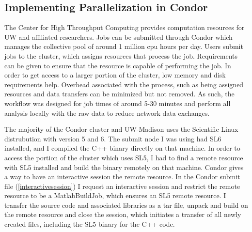 \subsection{Implementing Parallelization in Condor}

The Center for High Throughput Computing provides computation resources for UW and affiliated researchers.  Jobs can be submitted through Condor \cite{beowulfbook-condor} which manages the collective pool of around 1 million cpu hours per day.  Users submit jobs to the cluster, which assigns resources that process the job.  Requirements can be given to ensure that the resource is capable of performing the job.  In order to get access to a larger portion of the cluster, low memory and disk requirements help.  Overhead associated with the process, such as being assigned resources and data transfers can be minimized but not removed. As such, the workflow was designed for job times of around 5-30 minutes and perform all analysis locally with the raw data to reduce network data exchanges.

The majority of the Condor cluster and UW-Madison uses the Scientific Linux distrubution with version 5 and 6.  The submit node I was using had SL6 installed, and I compiled the C++ binary directly on that machine.  In order to access the portion of the cluster which uses SL5, I had to find a remote resource with SL5 installed and build the binary remotely on that machine.  Condor gives a way to have an interactive session the remote resource.  In the Condor submit file (\cref{interactivesession}) I request an interactive session and restrict the remote resource to be a MatlabBuildJob, which ensures an SL5 remote resource.  I transfer the source code and associated libraries as a tar file, unpack and build on the remote resource and close the session, which initiates a transfer of all newly created files, including the SL5 binary for the C++ code.

\linespread{1}

\linespread{2}


